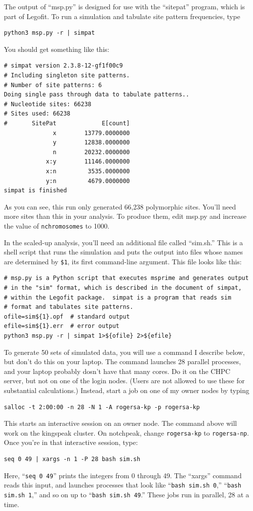 \documentclass[11pt]{article}
\begin{document}
The output of ``msp.py'' is designed for use with the ``sitepat''
program, which is part of Legofit. To run a simulation and tabulate
site pattern frequencies, type
\begin{verbatim}
python3 msp.py -r | simpat
\end{verbatim}
You should get something like this:
\begin{verbatim}
# simpat version 2.3.8-12-gf1f00c9
# Including singleton site patterns.
# Number of site patterns: 6
Doing single pass through data to tabulate patterns..
# Nucleotide sites: 66238
# Sites used: 66238
#       SitePat             E[count]
              x        13779.0000000
              y        12838.0000000
              n        20232.0000000
            x:y        11146.0000000
            x:n         3535.0000000
            y:n         4679.0000000
simpat is finished
\end{verbatim}
As you can see, this run only generated 66,238 polymorphic sites.
You'll need more sites than this in your analysis. To produce them,
edit msp.py and increase the value of \texttt{nchromosomes} to 1000.

In the scaled-up analysis, you'll need an additional file called
``sim.sh.'' This is a shell script that runs the simulation and puts
the output into files whose names are determined by \verb|$1|, its
first command-line argument. This file looks like this:
\begin{verbatim}
# msp.py is a Python script that executes msprime and generates output
# in the "sim" format, which is described in the document of simpat,
# within the Legofit package.  simpat is a program that reads sim
# format and tabulates site patterns.
ofile=sim${1}.opf  # standard output
efile=sim${1}.err  # error output
python3 msp.py -r | simpat 1>${ofile} 2>${efile}
\end{verbatim}
To generate 50 sets of simulated data, you will use a command I
describe below, but don't do this on your laptop. The command launches
28 parallel processes, and your laptop probably dosn't have that many
cores. Do it on the CHPC server, but not on one of the login
nodes. (Users are not allowed to use these for substantial
calculations.) Instead, start a job on one of my owner nodes by typing
\begin{verbatim}
salloc -t 2:00:00 -n 28 -N 1 -A rogersa-kp -p rogersa-kp
\end{verbatim}
This starts an interactive session on an owner node. The command above
will work on the kingspeak cluster. On notchpeak, change
\texttt{rogersa-kp} to \texttt{rogersa-np}. Once you're in that
interactive session, type:
\begin{verbatim}
seq 0 49 | xargs -n 1 -P 28 bash sim.sh
\end{verbatim}
Here, ``\texttt{seq 0 49}'' prints the integers from 0 through 49. The
``xargs'' command reads this input, and launches processes that look
like ``\texttt{bash sim.sh 0},'' ``\texttt{bash sim.sh 1},'' and so on
up to ``\texttt{bash sim.sh 49}.'' These jobs run in parallel, 28 at a
time.
\end{document}

